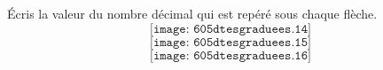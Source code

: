 \par\'Ecris la valeur du nombre décimal qui est repéré sous chaque flèche.
\[\texttt{[image: 605dtesgraduees.14]}\]
\[\texttt{[image: 605dtesgraduees.15]}\]
\[\texttt{[image: 605dtesgraduees.16]}\]